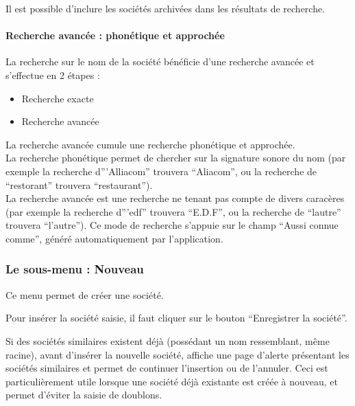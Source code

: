 Il est possible d'inclure les sociétés archivées dans les résultats de recherche.

\paragraph{Recherche avancée : phonétique et approchée}

La recherche sur le nom de la société bénéficie d'une recherche avancée et s'effectue en 2 étapes :\\

\begin{itemize}
\item Recherche exacte
\item Recherche avancée
\end{itemize}
\vspace{0.3cm}

La recherche avancée cumule une recherche phonétique et approchée.\\

La recherche phonétique permet de chercher sur la signature sonore du nom (par exemple la recherche d'''Alliacom'' trouvera ``Aliacom'', ou la recherche de ``restorant'' trouvera ``restaurant'').\\

La recherche avancée est une recherche ne tenant pas compte de divers caracères (par exemple la recherche d'''edf'' trouvera ``E.D.F'', ou la recherche de ``lautre'' trouvera ``l'autre''). Ce mode de recherche s'appuie sur le champ ``Aussi connue comme'', généré automatiquement par l'application.


\subsubsection{Le sous-menu : Nouveau}

Ce menu permet de créer une société.

Pour insérer la société saisie, il faut cliquer sur le bouton ``Enregistrer la société''.

Si des sociétés similaires existent déjà (possédant un nom ressemblant, même racine), avant d'insérer la nouvelle société, \obm affiche une page d'alerte présentant les sociétés similaires et permet de continuer l'insertion ou de l'annuler.
Ceci est particulièrement utile lorsque une société déjà existante est créée à nouveau, et permet d'éviter la saisie de doublons.

